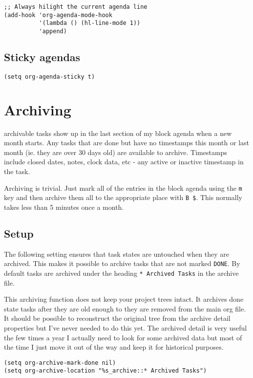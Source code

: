 \documentclass[11pt]{scrartcl}
\begin{document}
\begin{verbatim}
;; Always hilight the current agenda line
(add-hook 'org-agenda-mode-hook
          '(lambda () (hl-line-mode 1))
          'append)
\end{verbatim}

\subsection{Sticky agendas}
\label{sec:orgheadline14}
\begin{verbatim}
(setq org-agenda-sticky t)
\end{verbatim}
\section{Archiving}
\label{sec:orgheadline18}

archivable tasks show up in the last section of my block agenda when a
new month starts.  Any tasks that are done but have no timestamps this
month or last month (ie. they are over 30 days old) are available to
archive.  Timestamps include closed dates, notes, clock data, etc - any
active or inactive timestamp in the task.

Archiving is trivial.  Just mark all of the entries in the block agenda
using the \texttt{m} key and then archive them all to the appropriate place
with \texttt{B \$}.  This normally takes less than 5 minutes once a month.

\subsection{Setup}
\label{sec:orgheadline16}

The following setting ensures that task states are untouched when they
are archived.  This makes it possible to archive tasks that are not
marked \texttt{DONE}.  By default tasks are archived under the heading \texttt{*
Archived Tasks} in the archive file.

This archiving function does not keep your project trees intact.  It
archives done state tasks after they are old enough to they are
removed from the main org file.  It should be possible to reconstruct
the original tree from the archive detail properties but I've never
needed to do this yet.  The archived detail is very useful the few
times a year I actually need to look for some archived data but most
of the time I just move it out of the way and keep it for historical
purposes.

\begin{verbatim}
(setq org-archive-mark-done nil)
(setq org-archive-location "%s_archive::* Archived Tasks")
\end{verbatim}
\end{document}
